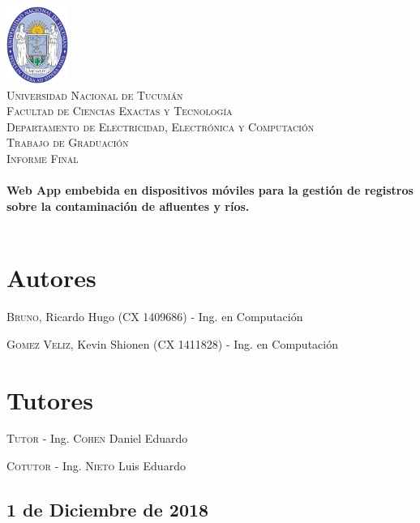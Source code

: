\begin{titlepage}
 
\begin{center}
 
 
\includegraphics[width=0.15\textwidth]{imagenes/logo-unt.png}\\[0.5cm]
 
\textsc{\LARGE Universidad Nacional de Tucumán}\\[0.5cm]

\textsc{\normalsize Facultad de Ciencias Exactas y Tecnología}\\[0.5cm]

\textsc{\small Departamento de Electricidad, Electrónica y Computación}\\[0.7cm]
 
\textsc{\LARGE Trabajo de Graduación}\\[0.1cm]

\textsc{\normalsize Informe Final}\\[0.1cm]
 
 
\HRule \\[0.4cm]
{ \LARGE \bfseries Web App embebida en dispositivos móviles para la gestión de registros sobre la contaminación de afluentes y ríos.
}\\[0.4cm]
\HRule \\[0.4cm]
 
\end{center} 

\section*{Autores}
\textsc{Bruno}, Ricardo Hugo (CX 1409686) - Ing. en Computación

\textsc{Gomez Veliz}, Kevin Shionen (CX 1411828) - Ing. en Computación

\section*{Tutores}
\textsc{Tutor - } Ing. \textsc{Cohen} Daniel Eduardo

\textsc{Cotutor - } Ing. \textsc{Nieto} Luis Eduardo

\begin{center}
\subsection*{1 de Diciembre de 2018}
\end{center}

\end{titlepage}